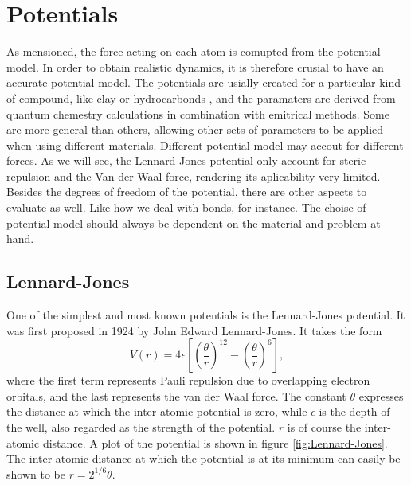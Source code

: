 \documentclass[twoside,english]{uiofysmaster}
\newcommand\lr[1]{\left(#1\right)}
\begin{document}
\section{Potentials}
As mensioned, the force acting on each atom is comupted from the potential model.
In order to obtain realistic dynamics, it is therefore crusial to have an accurate potential model. 
The potentials are usially created for a particular kind of compound, like clay or hydrocarbonds \cite{Cygan2004,VanDuin2001}, and the paramaters are derived from quantum chemestry calculations in combination with emitrical methods.
Some are more general than others, allowing other sets of parameters to be applied when using different materials. 
Different potential model may accout for different forces. 
As we will see, the Lennard-Jones potential only account for steric repulsion and the Van der Waal force, rendering its aplicability very limited.
Besides the degrees of freedom of the potential, there are other aspects to evaluate as well. 
Like how we deal with bonds, for instance.
The choise of potential model should always be dependent on the material and problem at hand.  
 

\subsection{Lennard-Jones} \label{sec:LJ}
One of the simplest and most known potentials is the Lennard-Jones potential. It was first proposed in 1924 by John Edward Lennard-Jones.  It takes the form
\begin{equation}
	V(r) = 4\epsilon\left[\lr{\frac{\theta}{r}}^{12} -  \lr{\frac{\theta}{r}}^6 \right], \label{eq:Lennard-Jones}
\end{equation}
where the first term represents Pauli repulsion due to overlapping electron orbitals, and the last represents the van der Waal force. 
The constant $\theta$ expresses the distance at which the inter-atomic potential is zero, while $\epsilon$ is the depth of the well, also regarded as the strength of the potential.
$r$ is of course the inter-atomic distance. 
A plot of the potential is shown in figure \ref{fig:Lennard-Jones}.
The inter-atomic distance at which the potential is at its minimum can easily be shown to be $r=2^{1/6}\theta$. 
\end{document}
